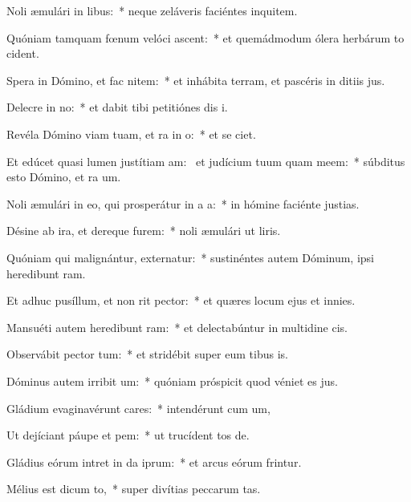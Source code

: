 \item Noli æmulári in libus:~* neque zeláveris faciéntes inquitem.
\item Quóniam tamquam fœnum velóci ascent:~* et quemádmodum ólera herbárum to cident.
\item Spera in Dómino, et fac nitem:~* et inhábita terram, et pascéris in ditiis jus.
\item Delecre in no:~* et dabit tibi petitiónes dis i.
\item Revéla Dómino viam tuam, et ra in o:~* et se ciet.
\item Et edúcet quasi lumen justítiam am:~\pscross{} et judícium tuum quam meem:~* súbditus esto Dómino, et ra um.
\item Noli æmulári in eo, qui prosperátur in a a:~* in hómine faciénte justias.
\item Désine ab ira, et dereque furem:~* noli æmulári ut liris.
\item Quóniam qui malignántur, externatur:~* sustinéntes autem Dóminum, ipsi heredibunt ram.
\item Et adhuc pusíllum, et non rit pector:~* et quæres locum ejus et  innies.
\item Mansuéti autem heredibunt ram:~* et delectabúntur in multidine cis.
\item Observábit pector tum:~* et stridébit super eum tibus is.
\item Dóminus autem irribit um:~* quóniam próspicit quod véniet es jus.
\item Gládium evaginavérunt cares:~* intendérunt cum um,
\item Ut dejíciant páupe et pem:~* ut trucídent tos de.
\item Gládius eórum intret in da iprum:~* et arcus eórum frintur.
\item Mélius est dicum to,~* super divítias peccarum tas.
